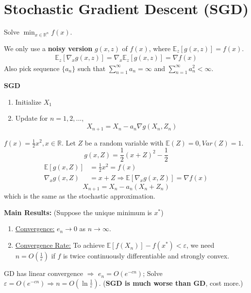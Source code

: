 \documentclass[11pt]{elegantbook}
\begin{document}
\section{Stochastic Gradient Descent (SGD)}
Solve $\min_{x\in\mathbb{R}^n}f(x)$.

We only use a \textbf{noisy version} $g(x,z)$ of $f(x)$, where $\mathbb{E}_z[g(x,z)]=f(x)$.
\begin{equation}
    \begin{aligned}
        \mathbb{E}_z[\nabla_x g(x,z)]=\nabla_x \mathbb{E}_z[g(x,z)]=\nabla f(x)
    \end{aligned}
    \nonumber
\end{equation}
Also pick sequence $\{a_n\}$ such that $\sum_{n=1}^\infty a_n=\infty$ and $\sum_{n=1}^\infty a^2_n<\infty$.

\textbf{SGD}
\begin{enumerate}[$\bullet$]
    \item Initialize $X_1$
    \item Update for $n=1,2,...$, $$X_{n+1}=X_n-a_n \nabla g(X_n,Z_n)$$
\end{enumerate}

\begin{example}
    $f(x)=\frac{1}{2}x^2,x\in \mathbb{R}$. Let $Z$ be a random variable with $\mathbb{E}(Z)=0,Var(Z)=1$. $$g(x,Z)=\frac{1}{2}(x+Z)^2-\frac{1}{2}$$
    \begin{equation}
        \begin{aligned}
            \mathbb{E}[g(x,Z)]&=\frac{1}{2}x^2=f(x)\\
            \nabla_x g(x,Z)&=x+Z \Rightarrow 
            \mathbb{E}[\nabla_xg(x,Z)]=\nabla f(x)
        \end{aligned}
        \nonumber
    \end{equation}
    $$X_{n+1}=X_n-a_n(X_n+Z_n)$$
    which is the same as the stochastic approximation.
\end{example}
\textbf{Main Results:} (Suppose the unique minimum is $x^*$)
\begin{enumerate}[(1)]
    \item \underline{Convergence:} $e_n \rightarrow 0$ as $n \rightarrow \infty$.
    \item \underline{Convergence Rate:} To achieve $\mathbb{E}[f(X_n)]-f(x^*)<\varepsilon$, we need $n=O(\frac{1}{\varepsilon})$ if $f$ is twice continuously differentiable and strongly convex.
\end{enumerate}

GD has linear convergence $\Rightarrow$ $e_n=O(e^{-cn})$; Solve $\varepsilon=O(e^{-cn}) \Rightarrow n=O(\ln \frac{1}{\varepsilon})$. (\textbf{SGD is much worse than GD}, cost more.)
\end{document}
